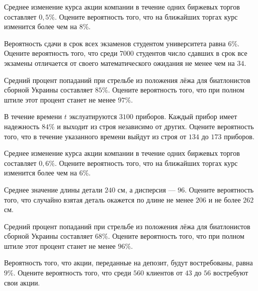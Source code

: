 \z Среднее изменение курса акции компании в течение одних биржевых торгов составляет $ 0{,}5 \% $. Оцените вероятность того, что на ближайших торгах курс изменится более чем на $ 8 \% $.


\vfill

\z Вероятность сдачи в срок всех экзаменов студентом университета равна $ 6 \% $. Оцените вероятность того, что среди $ 7000 $ студентов число сдавших в срок все экзамены отличается от своего математического ожидания не менее чем на $ 34 $. 
 

\vfill

\newpage\setcounter{zad}{0}

\z Средний процент попаданий при стрельбе из положения лёжа для биатлонистов сборной Украины составляет $ 85 \% $. Оцените вероятность того, что при полном штиле этот процент станет не менее $ 97 \% $.


\vfill

\z В течение времени $t$ экслуатируются $ 3100 $ приборов. Каждый прибор имеет надежность $ 84 \% $ и выходит из строя независимо от других. Оцените вероятность того, что в течение указанного времени выйдут из строя от $ 134 $ до $ 173 $ приборов.
 

\vfill

\newpage\setcounter{zad}{0}

\z Среднее изменение курса акции компании в течение одних биржевых торгов составляет $ 0{,}6 \% $. Оцените вероятность того, что на ближайших торгах курс изменится более чем на $ 6 \% $.


\vfill

\z Среднее значение длины детали $ 240 $ см, а дисперсия --- $ 96 $. Оцените вероятность того, что случайно взятая деталь окажется по длине не менее $ 206 $ и не более $ 262 $ см.
 

\vfill

\newpage\setcounter{zad}{0}

\z Средний процент попаданий при стрельбе из положения лёжа для биатлонистов сборной Украины составляет $ 68 \% $. Оцените вероятность того, что при полном штиле этот процент станет не менее $ 96 \% $.


\vfill

\z Вероятность того, что акции, переданные на депозит, будут востребованы, равна $ 9 \% $. Оцените вероятность того, что среди $ 560 $ клиентов от $ 43 $ до $ 56 $ востребуют свои акции.
 

\vfill

\newpage\setcounter{zad}{0}

